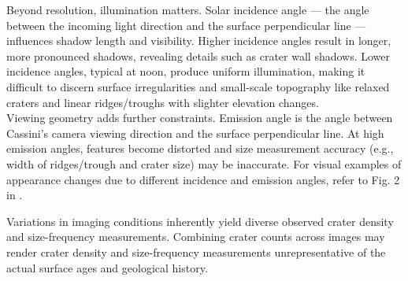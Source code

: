 \documentclass[preprint,12pt,3p,times,authoryear]{elsarticle}
\begin{document}
Beyond resolution, illumination matters. Solar incidence angle — the angle between the incoming light direction and the surface perpendicular line — influences shadow length and visibility. Higher incidence angles result in longer, more pronounced shadows, revealing details such as crater wall shadows. Lower incidence angles, typical at noon, produce uniform illumination, making it difficult to discern surface irregularities and small-scale topography like relaxed craters and linear ridges/troughs with slighter elevation changes.\\

Viewing geometry adds further constraints. Emission angle is the angle between Cassini's camera viewing direction and the surface perpendicular line. At high emission angles, features become distorted and size measurement accuracy (e.g., width of ridges/trough and crater size) may be inaccurate. For visual examples of appearance changes due to different incidence and emission angles, refer to Fig. 2 in \citet{Bland2018}.

Variations in imaging conditions inherently yield diverse observed crater density and size-frequency measurements. Combining crater counts across images may render crater density and size-frequency measurements unrepresentative of the actual surface ages and geological history.\\
\end{document}
